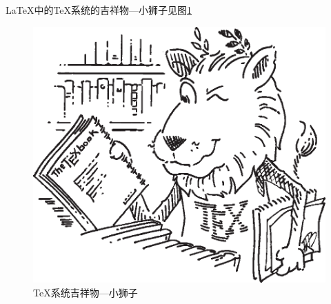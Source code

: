 \documentclass{ctexart}
\begin{document}



    
    \LaTeX{}中的\TeX 系统的吉祥物---小狮子见图\ref{fig-lion}
    \begin{figure}[htbp]
        \centering
        \includegraphics[scale=0.3]{lion}
        \caption{\TeX 系统吉祥物---小狮子}\label{fig-lion}
    \end{figure}
\end{document}
